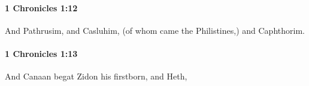 		\paragraph{1 Chronicles 1:12} %
			\label{1CHRONICLES-1-12}

			And Pathrusim, and Casluhim, (of whom came the Philistines,) and Caphthorim.


		\paragraph{1 Chronicles 1:13} %
			\label{1CHRONICLES-1-13}

			And Canaan begat Zidon his firstborn, and Heth,


